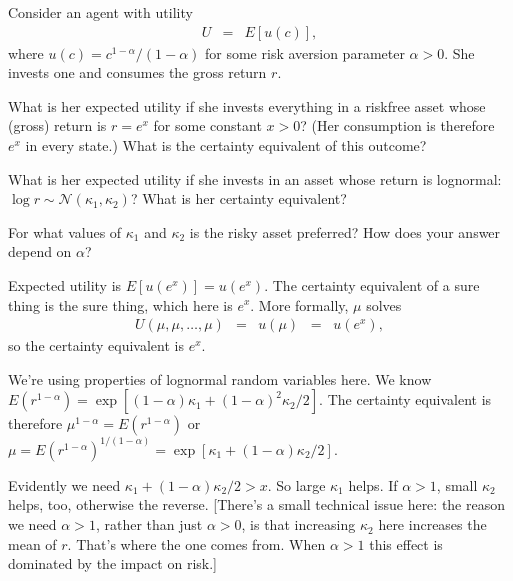 \documentclass[11pt]{exam}
\begin{document}
\begin{questions}
Consider an agent with utility
\begin{eqnarray*}
    U &=&  E [u(c)] ,   %
\end{eqnarray*}
where $u(c) = c^{1-\alpha}/(1-\alpha)$ for some risk aversion parameter $\alpha > 0$.
She invests one and consumes the gross return $r$.

\begin{parts}
\item What is her expected utility if she invests everything in a riskfree asset
whose (gross) return is $r = e^x$ for some constant $x>0$?
(Her consumption is therefore $e^x$ in every state.)
What is the certainty equivalent of this outcome?
\item What is her expected utility if she invests in an asset whose return is lognormal:
$ \log r \sim \mathcal{N}(\kappa_1,\kappa_2)$?
What is her certainty equivalent?
\item For what values of $\kappa_1$ and $\kappa_2$ is the risky asset preferred?
How does your answer depend on $\alpha$?
\end{parts}

\begin{solution}
\begin{parts}
\item Expected utility is $E [u(e^x)] = u(e^x)$.
The certainty equivalent of a sure thing is the sure thing,
which here is $e^x$.
More formally, $\mu$ solves
\begin{eqnarray*}
    U(\mu, \mu, \ldots, \mu) &=& u(\mu) \;\;=\;\; u(e^x),
\end{eqnarray*}
so the certainty equivalent is $e^x$.

\item We're using properties of lognormal random variables here.
We know $ E(r^{1-\alpha})= \exp[ (1-\alpha)\kappa_1 + (1-\alpha)^2\kappa_2/2]$.
The certainty equivalent is therefore
$ \mu^{1-\alpha} = E(r^{1-\alpha})$
or $\mu = E(r^{1-\alpha})^{1/(1-\alpha)} = \exp[\kappa_1 + (1-\alpha)\kappa_2/2]$.

\item Evidently we need
$ \kappa_1 + (1-\alpha)\kappa_2/2 > x $.
So large $\kappa_1 $ helps.  If $\alpha > 1$, small $\kappa_2$ helps, too,
otherwise the reverse.
[There's a small technical issue here:  the reason we need $\alpha > 1$,
rather than just $\alpha > 0$, is that increasing $\kappa_2$ here
increases the mean of $r$.  That's where the one comes from.
When $\alpha>1$ this effect is dominated by the impact on risk.]
\end{parts}
\end{solution}



\end{questions}
\end{document}
